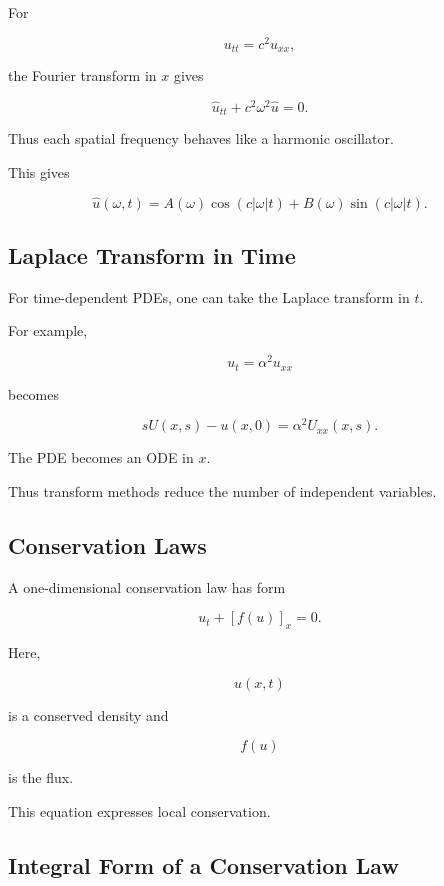 For

\[
u_{tt}
=
c^2u_{xx},
\]

the Fourier transform in \(x\) gives

\[
\boxed{
\widehat{u}_{tt}
+
c^2\omega^2
\widehat{u}
=
0.
}
\]

Thus each spatial frequency behaves like a harmonic oscillator.

This gives

\[
\boxed{
\widehat{u}(\omega,t)
=
A(\omega)\cos(c|\omega|t)
+
B(\omega)\sin(c|\omega|t).
}
\]

\subsection{Laplace Transform in Time}
\label{subsec:pde-laplace-time-transform}

For time-dependent PDEs, one can take the Laplace transform in \(t\).

For example,

\[
u_t
=
\alpha^2u_{xx}
\]

becomes

\[
\boxed{
sU(x,s)
-
u(x,0)
=
\alpha^2U_{xx}(x,s).
}
\]

The PDE becomes an ODE in \(x\).

Thus transform methods reduce the number of independent variables.

\subsection{Conservation Laws}
\label{subsec:conservation-laws-pde}

A one-dimensional conservation law has form

\[
\boxed{
u_t
+
[f(u)]_x
=
0.
}
\]

Here,

\[
u(x,t)
\]

is a conserved density and

\[
f(u)
\]

is the flux.

This equation expresses local conservation.

\subsection{Integral Form of a Conservation Law}
\label{subsec:integral-conservation-law}

